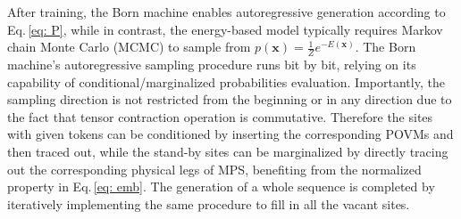 \documentclass[aps,prb,twocolumn,superscriptaddress]{revtex4-2}
\newcommand{\vect}[1]{{\bm{#1}}}
\newcommand{\eqnref}[1]{Eq.\,\eqref{#1}}
\begin{document}
After training, the Born machine enables autoregressive generation according to \eqnref{eq: P}, while in contrast, the energy-based model typically requires Markov chain Monte Carlo (MCMC) to sample from $p(\vect{x})=\frac{1}{Z}e^{-E(\vect{x})}$. The Born machine's autoregressive sampling procedure runs bit by bit, relying on its capability of conditional/marginalized probabilities evaluation. Importantly, the sampling direction is not restricted from the beginning or in any direction due to the fact that tensor contraction operation is commutative. Therefore the sites with given tokens can be conditioned by inserting the corresponding POVMs and then traced out, while the stand-by sites can be marginalized by directly tracing out the corresponding physical legs of MPS, benefiting from the normalized property in \eqnref{eq: emb}. The generation of a whole sequence is completed by iteratively implementing the same procedure to fill in all the vacant sites.
\end{document}
